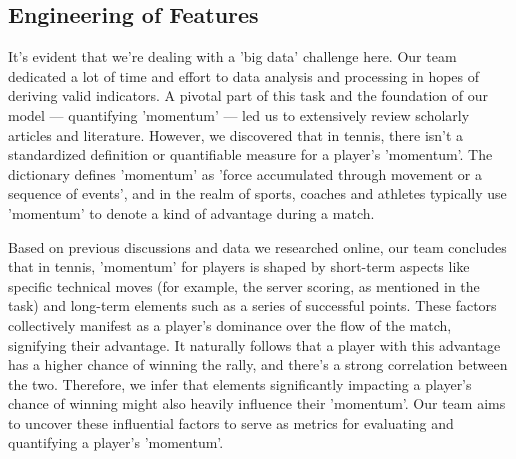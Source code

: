 \documentclass[12pt]{article}  %
\begin{document}
\subsection{Engineering of Features}
It's evident that we're dealing with a 'big data' challenge here. 
Our team dedicated a lot of time and effort to data analysis and processing in hopes of deriving valid indicators. 
A pivotal part of this task and the foundation of our model — quantifying 'momentum' — led us to extensively review scholarly 
articles and literature. 
However, we discovered that in tennis, there isn't a standardized definition or quantifiable measure for a player's 'momentum'. 
The dictionary defines 'momentum' as 'force accumulated through movement or a sequence of events', and in the realm of sports, 
coaches and athletes typically use 'momentum' to denote a kind of advantage during a match.

Based on previous discussions and data we researched online, 
our team concludes that in tennis, 'momentum' for players is shaped by short-term aspects like specific technical moves 
(for example, the server scoring, as mentioned in the task) and long-term elements such as a series of successful points. 
These factors collectively manifest as a player's dominance over the flow of the match, signifying their advantage. 
It naturally follows that a player with this advantage has a higher chance of winning the rally, 
and there's a strong correlation between the two. Therefore, we infer that elements significantly impacting a player's chance of winning 
might also heavily influence their 'momentum'. 
Our team aims to uncover these influential factors to serve as metrics for evaluating and quantifying a player's 'momentum'.
\end{document}

